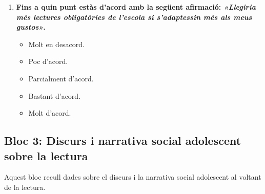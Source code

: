 \documentclass[12pt]{article}
\newcommand{\subsectiononumber}[1]{%
  \subsection*{#1}
  \phantomsection
}
\begin{document}
\begin{enumerate}
    \item \textbf{Fins a quin punt estàs d'acord amb la següent afirmació: \textit{«Llegiria més lectures obligatòries de l'escola si s'adaptessin més als meus gustos»}.}
    \begin{itemize}
        \item[$\square$] Molt en desacord.
        \item[$\square$] Poc d'acord.
        \item[$\square$] Parcialment d'acord.
        \item[$\square$] Bastant d'acord.
        \item[$\square$] Molt d'acord.
    \end{itemize}
\end{enumerate}

\subsectiononumber{Bloc 3: Discurs i narrativa social adolescent sobre la lectura}
Aquest bloc recull dades sobre el discurs i la narrativa social adolescent al voltant de la lectura.
\end{document}
